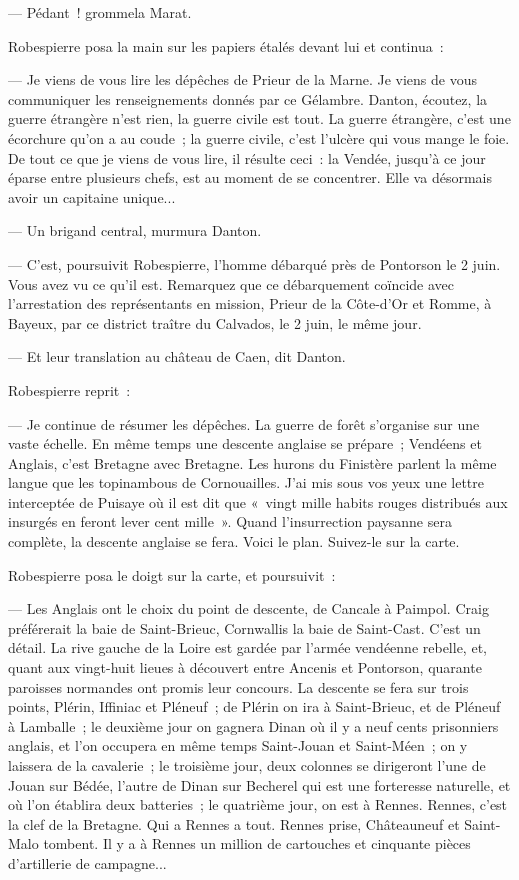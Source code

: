 \documentclass[french,twoside]{book} %
\begin{document}
— Pédant ! grommela Marat.\par
Robespierre posa la main sur les papiers étalés devant lui et continua :\par
— Je viens de vous lire les dépêches de Prieur de la Marne. Je viens de vous communiquer les renseignements donnés par ce Gélambre. Danton, écoutez, la guerre étrangère n’est rien, la guerre civile est tout. La guerre étrangère, c’est une écorchure qu’on a au coude ; la guerre civile, c’est l’ulcère qui vous mange le foie. De tout ce que je viens de vous lire, il résulte ceci : la Vendée, jusqu’à ce jour éparse entre plusieurs chefs, est au moment de se concentrer. Elle va désormais avoir un capitaine unique...\par
— Un brigand central, murmura Danton.\par
— C’est, poursuivit Robespierre, l’homme débarqué près de Pontorson le 2 juin. Vous avez vu ce qu’il est. Remarquez que ce débarquement coïncide avec  l’arrestation des représentants en mission, Prieur de la Côte-d’Or et Romme, à Bayeux, par ce district traître du Calvados, le 2 juin, le même jour.\par
— Et leur translation au château de Caen, dit Danton.\par
Robespierre reprit :\par
— Je continue de résumer les dépêches. La guerre de forêt s’organise sur une vaste échelle. En même temps une descente anglaise se prépare ; Vendéens et Anglais, c’est Bretagne avec Bretagne. Les hurons du Finistère parlent la même langue que les topinambous de Cornouailles. J’ai mis sous vos yeux une lettre interceptée de Puisaye où il est dit que « vingt mille habits rouges distribués aux insurgés en feront lever cent mille ». Quand l’insurrection paysanne sera complète, la descente anglaise se fera. Voici le plan. Suivez-le sur la carte.\par
Robespierre posa le doigt sur la carte, et poursuivit :\par
— Les Anglais ont le choix du point de descente, de Cancale à Paimpol. Craig préférerait la baie de Saint-Brieuc, Cornwallis la baie de Saint-Cast. C’est un détail. La rive gauche de la Loire est gardée par l’armée vendéenne rebelle, et, quant aux vingt-huit lieues à découvert entre Ancenis et Pontorson, quarante paroisses normandes ont promis leur concours. La descente se fera sur trois points, Plérin, Iffiniac et Pléneuf ; de Plérin on ira à Saint-Brieuc, et de Pléneuf à Lamballe ; le deuxième jour on gagnera Dinan où il y a neuf cents prisonniers anglais, et l’on occupera  en même temps Saint-Jouan et Saint-Méen ; on y laissera de la cavalerie ; le troisième jour, deux colonnes se dirigeront l’une de Jouan sur Bédée, l’autre de Dinan sur Becherel qui est une forteresse naturelle, et où l’on établira deux batteries ; le quatrième jour, on est à Rennes. Rennes, c’est la clef de la Bretagne. Qui a Rennes a tout. Rennes prise, Châteauneuf et Saint-Malo tombent. Il y a à Rennes un million de cartouches et cinquante pièces d’artillerie de campagne...\par
\end{document}
